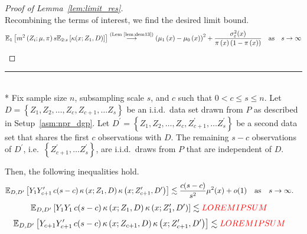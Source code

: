 \begin{proof}[Proof of Lemma~\ref{lem:limit_res}]
\begin{equation}
	\end{equation}
	Recombining the terms of interest, we find the desired limit bound.
	\begin{equation}
		\begin{aligned}
			\mathbb{E}_{1}\left[m^2\left(Z_{i}; \mu, \pi\right) s \mathbb{E}_{2:s}\left[\kappa(x; Z_1, D)\right]\right]
			\overset{\text{(Lem~\ref{lem:dem13})}}{\longrightarrow} \left(\mu_1\left(x\right) - \mu_0\left(x\right)\right)^2 + \frac{\sigma_{\varepsilon}^2(x)}{\pi\left(x\right)\left(1 - \pi\left(x\right)\right)}
			\quad \text{as} \quad s \rightarrow \infty
		\end{aligned}
	\end{equation}
\end{proof}

\hrule

\begin{lem}\label{lem:kern_ineq1}\mbox{}\\*
	Fix sample size $n$, subsampling scale $s$, and $c$ such that $0 < c \leq s \leq n$.
	Let $D = \left\{Z_1, Z_2, \dotsc, Z_c, Z_{c+1}, \dotsc Z_s \right\}$ be an i.i.d.\ data set drawn from $P$ as described in Setup~\ref{asm:npr_dgp}.
	Let $D^{\prime} = \left\{Z_1, Z_2, \dotsc, Z_c, Z_{c+1}^{\prime}, \dotsc Z_s^{\prime} \right\}$ be a second data set that shares the first $c$ observations with $D$.
	The remaining $s - c$ observations of $D^{\prime}$, i.e.\ $\left\{Z_{c+1}^{\prime}, \dotsc Z_s^{\prime} \right\}$, are i.i.d.\ draws from $P$ that are independent of $D$.

	Then, the following inequalities hold.
	\begin{equation}
		\begin{aligned}
			\mathbb{E}_{D, D^{\prime}}\left[Y_{1}Y_{c+1}^{\prime} \, c(s-c) \, \kappa\left(x; Z_{1}, D\right)\kappa\left(x; Z_{c+1}^{\prime}, D^{\prime}\right)\right]
			& \lesssim  \frac{c(s-c)}{s^2}\mu^2(x) + o(1)
			\quad \text{as} \quad s \rightarrow \infty.
		\end{aligned}
	\end{equation}
	\begin{equation}
		\begin{aligned}
			\mathbb{E}_{D, D^{\prime}}\left[Y_{1}Y_{1} \, c(s-c) \, \kappa\left(x; Z_{1}, D\right)\kappa\left(x; Z_{1}^{\prime}, D^{\prime}\right)\right]
			& \lesssim  {\color{red} LOREM IPSUM}
		\end{aligned}
	\end{equation}
	\begin{equation}
		\begin{aligned}
			\mathbb{E}_{D, D^{\prime}}\left[Y_{c+1}Y_{c+1}^{\prime} \, c(s-c) \, \kappa\left(x; Z_{c+1}, D\right)\kappa\left(x; Z_{c+1}^{\prime}, D^{\prime}\right)\right]
			& \lesssim  {\color{red} LOREM IPSUM}
		\end{aligned}
	\end{equation}


\end{lem}
